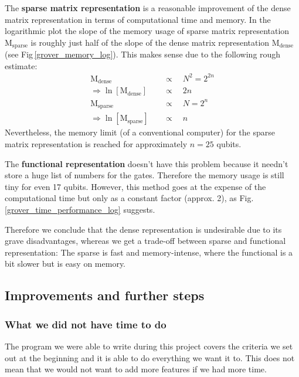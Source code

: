 \documentclass[bibliography=totocnumbered, 10pt]{article}
\theoremstyle{NoticeStyle}
\begin{document}
The \textbf{sparse matrix representation} is a reasonable improvement of the dense matrix representation in terms of computational time and memory. In the logarithmic plot the slope of the memory usage of sparse matrix representation $\text{M}_\text{sparse}$ is roughly just half of the slope of the dense matrix representation $\text{M}_\text{dense}$ (see Fig\,\ref{grover_memory_log}). This makes sense due to the following rough estimate:
%
\begin{align*}
	\text{M}_\text{dense} \quad&\propto\quad N^2 = 2^{2 n}\\
	\Rightarrow \ln\left[\text{M}_\text{dense}\right] \quad&\propto\quad 2 n\\
	\text{M}_\text{sparse} \quad&\propto\quad N = 2^n\\
	\Rightarrow \ln\left[\text{M}_\text{sparse}\right] \quad&\propto\quad n
\end{align*}
%
Nevertheless, the memory limit (of a conventional computer) for the sparse matrix representation is reached for approximately $n=25$ qubits.

The \textbf{functional representation} doesn't have this problem because it needn't store a huge list of numbers for the gates. Therefore the memory usage is still tiny for even 17 qubits. However, this method goes at the expense of the computational time but only as a constant factor (approx. 2), as Fig.\,\ref{grover_time_performance_log} suggests.

Therefore we conclude that the dense representation is undesirable due to its grave disadvantages, whereas we get a trade-off between sparse and functional representation: The sparse is fast and memory-intense, where the functional is a bit slower but is easy on memory.


\subsection{Improvements and further steps}
\subsubsection{What we did not have time to do}
The program we were able to write during this project covers the criteria we set out at the beginning and it is able to do everything we want it to. This does not mean that we would not want to add more features if we had more time.
\end{document}
